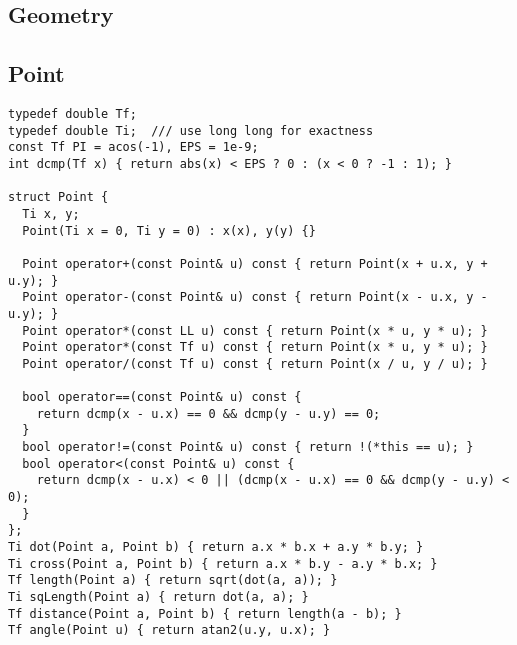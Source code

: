 \documentclass[FSZ,a4paper,onesided]{article}
\begin{document}
\begin{multicols*}{\COLS}
\section{Geometry}
\subsection{Point}
\begin{lstlisting}
typedef double Tf;
typedef double Ti;  /// use long long for exactness
const Tf PI = acos(-1), EPS = 1e-9;
int dcmp(Tf x) { return abs(x) < EPS ? 0 : (x < 0 ? -1 : 1); }

struct Point {
  Ti x, y;
  Point(Ti x = 0, Ti y = 0) : x(x), y(y) {}

  Point operator+(const Point& u) const { return Point(x + u.x, y + u.y); }
  Point operator-(const Point& u) const { return Point(x - u.x, y - u.y); }
  Point operator*(const LL u) const { return Point(x * u, y * u); }
  Point operator*(const Tf u) const { return Point(x * u, y * u); }
  Point operator/(const Tf u) const { return Point(x / u, y / u); }

  bool operator==(const Point& u) const {
    return dcmp(x - u.x) == 0 && dcmp(y - u.y) == 0;
  }
  bool operator!=(const Point& u) const { return !(*this == u); }
  bool operator<(const Point& u) const {
    return dcmp(x - u.x) < 0 || (dcmp(x - u.x) == 0 && dcmp(y - u.y) < 0);
  }
};
Ti dot(Point a, Point b) { return a.x * b.x + a.y * b.y; }
Ti cross(Point a, Point b) { return a.x * b.y - a.y * b.x; }
Tf length(Point a) { return sqrt(dot(a, a)); }
Ti sqLength(Point a) { return dot(a, a); }
Tf distance(Point a, Point b) { return length(a - b); }
Tf angle(Point u) { return atan2(u.y, u.x); }


\end{lstlisting}
\end{multicols*}
\end{document}

